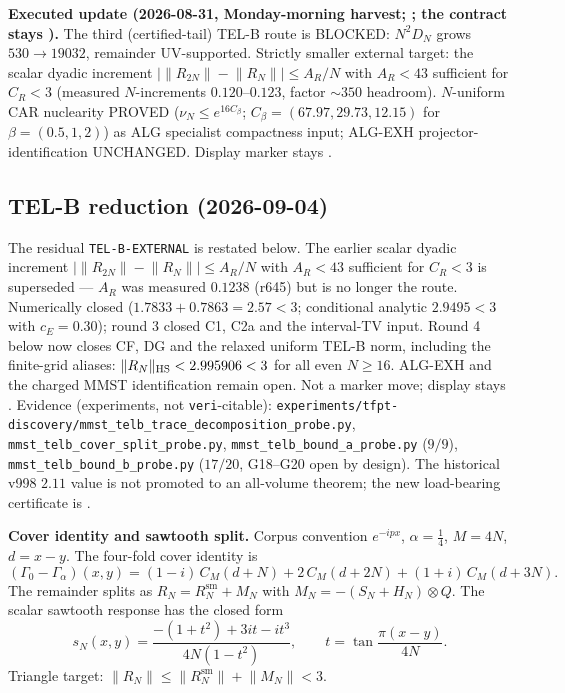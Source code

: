 \documentclass[11pt,a4paper]{article}
\begin{document}
\par\smallskip\noindent\textbf{Executed update (2026-08-31, Monday-morning harvest;
;
the contract stays \mO).}
The third (certified-tail) TEL-B route is BLOCKED: $N^2 D_N$ grows $530\to19032$,
remainder UV-supported.  Strictly smaller external target: the scalar dyadic increment
$\lvert\lVert R_{2N}\rVert-\lVert R_N\rVert\rvert\le A_R/N$ with $A_R<43$ sufficient for
$C_R<3$ (measured $N$-increments $0.120$--$0.123$, factor $\sim350$ headroom).  $N$-uniform
CAR nuclearity PROVED ($\nu_N\le e^{16 C_\beta}$; $C_\beta=(67.97,29.73,12.15)$ for
$\beta=(0.5,1,2)$) as ALG specialist compactness input; ALG-EXH projector-identification
UNCHANGED.  Display marker stays \mO.

\subsection*{TEL-B reduction (2026-09-04)}
\noindent The residual \texttt{TEL-B-EXTERNAL} is restated below.  The earlier scalar
dyadic increment $\lvert\lVert R_{2N}\rVert-\lVert R_N\rVert\rvert\le A_R/N$ with
$A_R<43$ sufficient for $C_R<3$ is superseded --- $A_R$ was measured $0.1238$ (r645)
but is no longer the route.  Numerically closed
($1.7833+0.7863=2.57<3$; conditional analytic $2.9495<3$ with $c_E=0.30$);
round 3 closed C1, C2a and the interval-TV input. Round 4 below now closes
CF, DG and the relaxed uniform TEL-B norm, including the finite-grid aliases:
$\|R_N\|_{\rm HS}<2.995906<3$ for all even $N\ge16$.
ALG-EXH and the charged MMST identification remain open.
Not a marker move; display stays \mO.
Evidence (experiments, not \texttt{veri}-citable):
\texttt{experiments/tfpt-discovery/mmst\_\allowbreak telb\_\allowbreak trace\_\allowbreak decomposition\_\allowbreak probe.py},
\texttt{mmst\_\allowbreak telb\_\allowbreak cover\_\allowbreak split\_\allowbreak probe.py},
\texttt{mmst\_\allowbreak telb\_\allowbreak bound\_\allowbreak a\_\allowbreak probe.py} ($9/9$),
\texttt{mmst\_\allowbreak telb\_\allowbreak bound\_\allowbreak b\_\allowbreak probe.py} ($17/20$, G18--G20 open by design).
The historical v998 $2.11$ value is not promoted to an all-volume theorem;
the new load-bearing certificate is
.

\par\smallskip\noindent\textbf{Cover identity and sawtooth split.}
Corpus convention $e^{-ipx}$, $\alpha=\tfrac14$, $M=4N$, $d=x-y$.  The four-fold
cover identity is
\begin{equation*}
  (\Gamma_0-\Gamma_\alpha)(x,y)
  =(1-i)\,C_M(d+N)+2\,C_M(d+2N)+(1+i)\,C_M(d+3N).
\end{equation*}
The remainder splits as $R_N=R_N^{\mathrm{sm}}+M_N$ with
$M_N=-(S_N+H_N)\otimes Q$.  The scalar sawtooth response has the closed form
\begin{equation*}
  s_N(x,y)=\frac{-(1+t^2)+3it-it^3}{4N(1-t^2)},\qquad
  t=\tan\frac{\pi(x-y)}{4N}.
\end{equation*}
Triangle target: $\lVert R_N\rVert\le\lVert R_N^{\mathrm{sm}}\rVert+\lVert M_N\rVert<3$.
\end{document}
